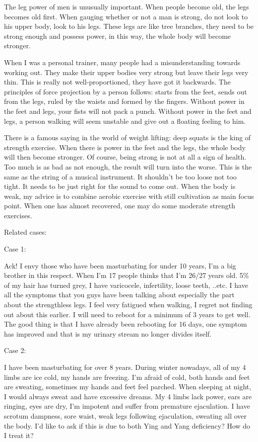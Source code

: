 \documentclass[
]{book}
\begin{document}
The leg power of men is unusually important. When people become old, the legs becomes old first. When gauging whether or not a man is strong, do not look to his upper body, look to his legs. These legs are like tree branches, they need to be strong enough and possess power, in this way, the whole body will become stronger.

When I was a personal trainer, many people had a misunderstanding towards working out. They make their upper bodies very strong but leave their legs very thin. This is really not well-proportioned, they have got it backwards. The principles of force projection by a person follows: starts from the feet, sends out from the legs, ruled by the waists and formed by the fingers. Without power in the feet and legs, your fists will not pack a punch. Without power in the feet and legs, a person walking will seem unstable and give out a floating feeling to him.

There is a famous saying in the world of weight lifting: deep squats is the king of strength exercise. When there is power in the feet and the legs, the whole body will then become stronger. Of course, being strong is not at all a sign of health. Too much is as bad as not enough, the result will turn into the worse. This is the same as the string of a musical instrument. It shouldn't be too loose not too tight. It needs to be just right for the sound to come out. When the body is weak, my advice is to combine aerobic exercise with still cultivation as main focus point. When one has almost recovered, one may do some moderate strength exercises.

Related cases:

Case 1:

Ack! I envy those who have been masturbating for under 10 years, I'm a big brother in this respect. When I'm 17 people thinks that I'm 26/27 years old. 5\% of my hair has turned grey, I have varicocele, infertility, loose teeth, ..etc. I have all the symptoms that you guys have been talking about especially the part about the strengthless legs. I feel very fatigued when walking, I regret not finding out about this earlier. I will need to reboot for a minimum of 3 years to get well. The good thing is that I have already been rebooting for 16 days, one symptom has improved and that is my urinary stream no longer divides itself.

Case 2:

I have been masturbating for over 8 years. During winter nowadays, all of my 4 limbs are ice cold, my hands are freezing. I'm afraid of cold, both hands and feet are sweating, sometimes my hands and feet feel parched. When sleeping at night, I would always sweat and have excessive dreams. My 4 limbs lack power, ears are ringing, eyes are dry, I'm impotent and suffer from premature ejaculation. I have scrotum dampness, sore waist, weak legs following ejaculation, sweating all over the body. I'd like to ask if this is due to both Ying and Yang deficiency? How do I treat it?
\end{document}
